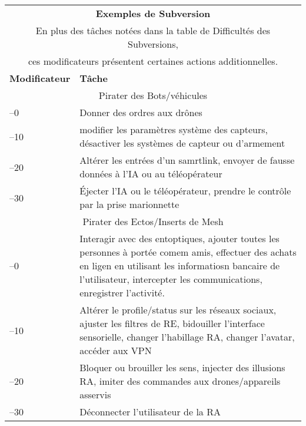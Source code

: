 \begin{table} 

\begin{tabularx}{\textwidth}{|l|X|} 

\hline

\multicolumn{2}{|c|}{\textbf{Exemples de Subversion}} \\ \multicolumn{2}{|c|}{En plus des tâches notées dans la table de Difficultés des Subversions,} \\ \multicolumn{2}{|c|}{ces modificateurs présentent certaines actions additionnelles.} \\ \hline

\textbf{Modificateur} &\textbf{Tâche} \\ \hline

\multicolumn{2}{|c|}{Pirater des Bots/véhicules} \\ \hline

–0 &Donner des ordres aux drônes \\ \hline

–10 &modifier les paramètres système des capteurs, désactiver les systèmes de capteur ou d'armement\\ \hline

–20 &Altérer les entrées d'un samrtlink, envoyer de fausse données à l'IA ou au téléopérateur\\ \hline

–30 &Éjecter l'IA ou le téléopérateur, prendre le contrôle par la prise marionnette\\ \hline

\multicolumn{2}{|c|}{Pirater des Ectos/Inserts de Mesh} \\ \hline

–0 &Interagir avec des entoptiques, ajouter toutes les personnes à portée comem amis, effectuer des achats en ligen en utilisant les informatiosn bancaire de l'utilisateur, intercepter les communications, enregistrer l'activité. \\ \hline

–10 &Altérer le profile/status sur les réseaux sociaux, ajuster les filtres de RE, bidouiller l'interface sensorielle, changer l'habillage RA, changer l'avatar, accéder aux VPN \\ \hline

–20 &Bloquer ou brouiller les sens, injecter des illusions RA, imiter des commandes aux drones/appareils asservis \\ \hline

–30 &Déconnecter l'utilisateur de la RA \\ \hline


\end{tabularx}
\end{table}
